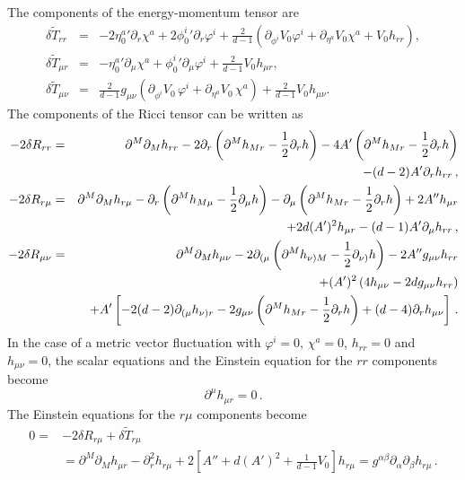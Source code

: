 The components of the energy-momentum tensor are
\begin{eqnarray}
	\delta \widetilde T_{rr} &=& -2{\eta_0^a}'\partial_r \chi^a+2{\phi_0^i}'\partial_r \varphi^i+\frac{2}{d-1}\left(\partial_{\phi^i} V_0 \varphi^i+\partial_{\eta^a} V_0 \chi^a+ V_0 h_{rr}\right),\\
	\delta \widetilde T_{\mu r} &=& -{\eta_0^a}' \partial_\mu\chi^a+{\phi^i_0}'\partial_\mu \varphi^i+\frac{2}{d-1}V_0 h_{\mu r},\\
	\delta \widetilde T_{\mu\nu} &=& \frac{2}{d-1}g_{\mu\nu} \left(\partial_{\phi^i} V_0\, \varphi^i+\partial_{\eta^a} V_0\, \chi^a\right)+\frac{2}{d-1}V_0 h_{\mu\nu}.
\end{eqnarray}
The components of the Ricci tensor can be written as
\begin{eqnarray}
 \notag   -2\delta R_{rr} &=&\partial^M\partial_M h_{rr}-2\partial_r\left(\partial^M h_{Mr}-\frac{1}{2}\partial_rh\right)-4 A'\left(\partial^M h_{Mr} -\frac{1}{2}\partial_r h\right)\\
	& & -(d-2)A' \partial_r h_{rr}\,,\\
 \notag    -2\delta R_{r\mu} &=& \partial^M\partial_M h_{r\mu}-\partial_r\left(\partial^M h_{M\mu}-\frac{1}{2}\partial_\mu h\right)-\partial_\mu\left(\partial^M h_{Mr}-\frac{1}{2}\partial_rh\right)+2 A'' h_{\mu r}
 \\
 & & + 2d(A')^2 h_{\mu r}-(d-1) A'\partial_\mu h_{rr}
 \,,\\
\notag    -2\delta R_{\mu\nu} &=& \partial^M\partial_M h_{\mu\nu}-2\partial_{(\mu}\left(\partial^M  h_{\nu) M}-\frac{1}{2}\partial_{\nu)} h\right)-2 A'' g_{\mu\nu}h_{r r}\\
\notag & & +(A')^2\left(4 h_{\mu\nu}-2d g_{\mu\nu} h_{rr}\right)\\
 & & +A'\left[-2(d-2)\partial_{(\mu} h_{\nu)r}-2g_{\mu\nu} \left(\partial^M h_{Mr}-\frac{1}{2}\partial_r h\right)+(d-4)\partial_r h_{\mu\nu}\right]\,.
\end{eqnarray}
In the case of a metric vector fluctuation with $\varphi^i=0$, $\chi^a=0$, $h_{rr}=0$ and $h_{\mu\nu}=0$, the scalar equations and the Einstein equation for the $rr$ components become
\begin{equation}\label{eq:transvapp}
	\partial^\mu h_{\mu r}=0\,.
\end{equation}
The Einstein equations for the $r\mu$ components become
\begin{equation}
\begin{split}
0=& -2\delta R_{r\mu}+\delta \widetilde T_{r\mu}\\ &=\partial^M\partial_M h_{\mu r}-\partial_r^2 h_{r\mu}+2\left[A''+d(A')^2+\frac{1}{d-1} V_0\right] h_{r\mu}=g^{\alpha\beta}\partial_\alpha \partial_\beta h_{r\mu}\,.
\end{split}
\end{equation}
